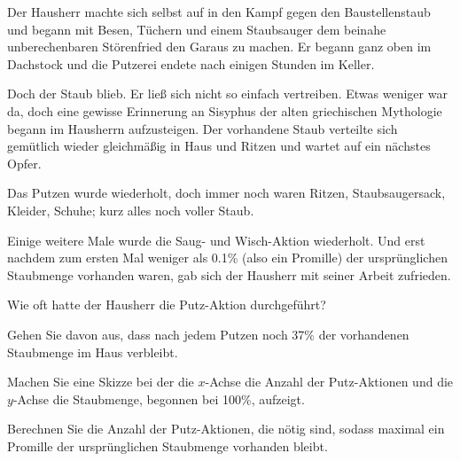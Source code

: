 Der Hausherr machte sich selbst auf in den Kampf gegen den Baustellenstaub und
begann mit Besen, Tüchern und einem Staubsauger dem beinahe
unberechenbaren Störenfried den Garaus zu machen. Er begann ganz oben
im Dachstock und die Putzerei endete nach einigen Stunden im Keller.

Doch der Staub blieb. Er ließ sich nicht so einfach vertreiben. Etwas
weniger war da, doch eine gewisse Erinnerung an Sisyphus der alten
griechischen Mythologie begann im Hausherrn aufzusteigen. Der
vorhandene Staub verteilte sich gemütlich wieder gleichmäßig in Haus
und Ritzen und wartet auf ein nächstes Opfer.

Das Putzen wurde wiederholt, doch immer noch waren Ritzen,
Staubsaugersack, Kleider, Schuhe; kurz alles noch voller Staub.

Einige weitere Male wurde die Saug- und Wisch-Aktion wiederholt. Und
erst nachdem zum ersten Mal weniger als 0.1\% (also ein Promille) der ursprünglichen
Staubmenge vorhanden waren, gab sich der Hausherr mit seiner Arbeit
zufrieden.

Wie oft hatte der Hausherr die Putz-Aktion durchgeführt?

Gehen Sie davon aus, dass nach jedem Putzen noch 37\% der vorhandenen
Staubmenge im Haus verbleibt.

\begin{bbwAufgabenBlock}

\item Machen Sie eine Skizze bei der die $x$-Achse die Anzahl der
  Putz-Aktionen und die $y$-Achse die Staubmenge, begonnen bei 100\%,
  aufzeigt.
  
\item Berechnen Sie die Anzahl der Putz-Aktionen, die nötig sind,
    sodass maximal ein Promille der ursprünglichen Staubmenge
    vorhanden bleibt.

\end{bbwAufgabenBlock}
\platzFuerBerechnungenBisEndeSeite{}



\newpage
